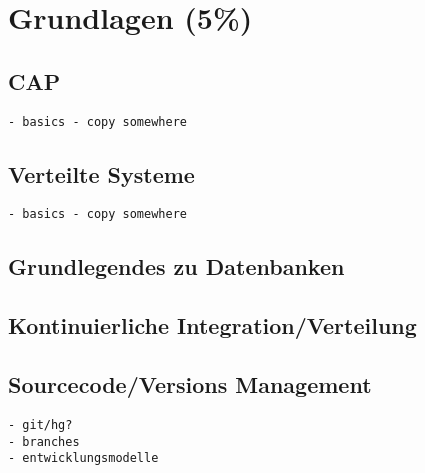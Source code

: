 \chapter{Grundlagen (5\%)}
\section{CAP}

\begin{verbatim}
- basics - copy somewhere
\end{verbatim}

\section{Verteilte Systeme}

\begin{verbatim}
- basics - copy somewhere
\end{verbatim}

\section{Grundlegendes zu Datenbanken}


\section{Kontinuierliche Integration/Verteilung}


\section{Sourcecode/Versions Management}

\begin{verbatim}
- git/hg?
- branches
- entwicklungsmodelle
\end{verbatim}
